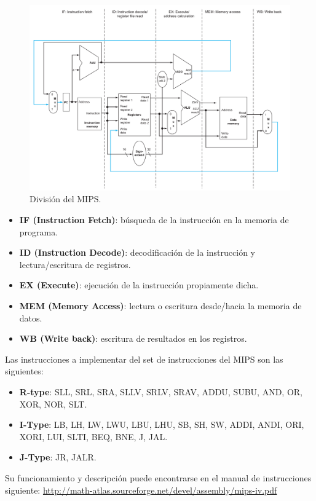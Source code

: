 \documentclass[12pt,A4paper,titlepage]{article}
\begin{document}
\begin{figure} [H]
    \centering
    \includegraphics[width=\textwidth]{figure/figure433-mips-segmentado-basico.png}
    \caption{División del MIPS.}
    \label{fig:div-mips}
\end{figure}

\begin{itemize}
    \item \textbf{IF (Instruction Fetch)}: búsqueda de la instrucción en la memoria de programa.
    \item \textbf{ID (Instruction Decode)}: decodificación de la instrucción y lectura/escritura de
    registros.
    \item \textbf{EX (Execute)}: ejecución de la instrucción propiamente dicha.
    \item \textbf{MEM (Memory Access)}: lectura o escritura desde/hacia la memoria de datos.
    \item \textbf{WB (Write back)}: escritura de resultados en los registros.
\end{itemize}



\noindent Las instrucciones a implementar del set de instrucciones del MIPS son las siguientes:

\begin{itemize}
    \item \textbf{R-type}: SLL, SRL, SRA, SLLV, SRLV, SRAV, ADDU, SUBU, AND, OR, XOR, NOR, SLT.
    \item \textbf{I-Type}: LB, LH, LW, LWU, LBU, LHU, SB, SH, SW, ADDI, ANDI, ORI, XORI, LUI, SLTI, BEQ, BNE, J, JAL.
    \item \textbf{J-Type}: JR, JALR.
\end{itemize}
\noindent Su funcionamiento y descripción puede encontrarse en el manual de instrucciones siguiente: 
\url{http://math-atlas.sourceforge.net/devel/assembly/mips-iv.pdf}
\end{document}
